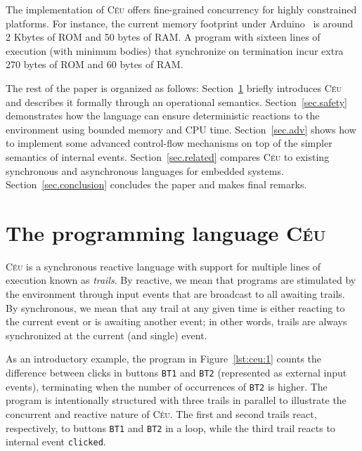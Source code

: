 \documentclass[preprint]{sigplanconf}
\newcommand{\CEU}{\textsc{C\'{e}u}\xspace}
\newcommand{\code}[1] {{\small{\texttt{#1}}}}
\newcommand{\1}{\;}
\newcommand{\2}{\;\;}
\newcommand{\3}{\;\;\;}
\newcommand{\5}{\;\;\;\;\;}
\begin{document}
The implementation of \CEU offers fine-grained concurrency for highly 
constrained platforms.
For instance, the current memory footprint under Arduino~\cite{arduino.cc} is 
around 2 Kbytes of ROM and 50 bytes of RAM.
A program with sixteen lines of execution (with minimum bodies) that 
synchronize on termination incur extra 270 bytes of ROM and 60 bytes of RAM.

The rest of the paper is organized as follows:
Section~\ref{sec.ceu} briefly introduces \CEU and describes it formally through 
an operational semantics.
Section~\ref{sec.safety} demonstrates how the language can ensure deterministic 
reactions to the environment using bounded memory and CPU time.
Section~\ref{sec.adv} shows how to implement some advanced control-flow 
mechanisms on top of the simpler semantics of internal events.
Section~\ref{sec.related} compares \CEU to existing synchronous and 
asynchronous languages for embedded systems.
Section~\ref{sec.conclusion} concludes the paper and makes final remarks.

\section{The programming language \CEU}
\label{sec.ceu}

\CEU is a synchronous reactive language with support for multiple lines of 
execution known as \emph{trails}.
By reactive, we mean that programs are stimulated by the environment through 
input events that are broadcast to all awaiting trails.
By synchronous, we mean that any trail at any given time is either reacting to 
the current event or is awaiting another event;
in other words, trails are always synchronized at the current (and single) 
event.

As an introductory example, the program in Figure~\ref{lst:ceu:1} counts the 
difference between clicks in buttons \code{BT1} and \code{BT2} (represented as 
external input events), terminating when the number of occurrences of 
\code{BT2} is higher.
The program is intentionally structured with three trails in parallel to 
illustrate the concurrent and reactive nature of \CEU.
The first and second trails react, respectively, to buttons \code{BT1} and 
\code{BT2} in a loop, while the third trail reacts to internal event 
\code{clicked}.
\end{document}
